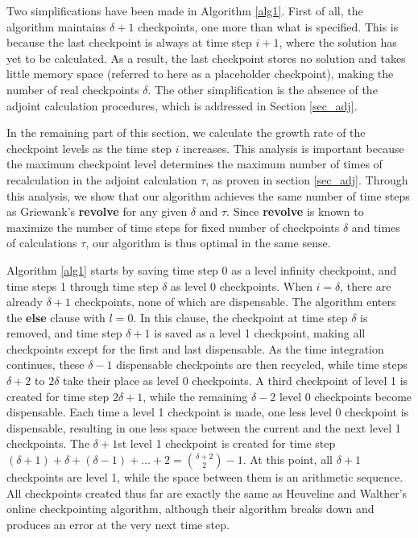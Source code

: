 Two simplifications have been made in Algorithm \ref{alg1}.
First of all, the algorithm maintains $\delta + 1$ checkpoints, one more than
what is specified.  This is because the last checkpoint is always at time step
$i + 1$, where the solution has yet to be calculated.  As a result, the last
checkpoint stores no solution and takes little memory space (referred
to here as a placeholder checkpoint), making the number of real checkpoints
$\delta$.  The other simplification is the absence of the adjoint calculation
procedures, which is addressed in Section \ref{sec_adj}.

In the remaining part of this section, we calculate the growth rate of the
checkpoint levels as the time step $i$ increases.  This analysis is important
because the maximum checkpoint level determines the maximum number of times of
recalculation in the adjoint calculation $\tau$, as proven in section
\ref{sec_adj}.  Through this analysis, we show that our algorithm achieves
the same number of time steps as Griewank's {\bf revolve} for any given $\delta$
and $\tau$.  Since {\bf revolve} is known to maximize the number of time steps
for fixed number of checkpoints $\delta$ and times of calculations $\tau$,
our algorithm is thus optimal in the same sense.

Algorithm \ref{alg1} starts by saving time step 0 as a level infinity
checkpoint, and time steps 1 through time step $\delta$ as
level 0 checkpoints.  When $i = \delta$, there are already $\delta + 1$
checkpoints, none of which are dispensable.  The algorithm enters the
{\bf else} clause with $l = 0$.  In this clause, the checkpoint at time step
$\delta$ is removed, and time step $\delta + 1$ is saved as a level 1
checkpoint, making all checkpoints except for the first and last
dispensable.  As the time integration continues, these $\delta - 1$ dispensable
checkpoints are then recycled, while time steps $\delta + 2$ to $2 \delta$ take
their place as level 0 checkpoints.  A third checkpoint of level 1 is created
for time step $2 \delta + 1$, while the remaining $\delta - 2$ level 0
checkpoints become dispensable.  Each time a level 1 checkpoint is made, one
less level 0 checkpoint is dispensable, resulting in one less space between
the current and the next level 1 checkpoints.  The $\delta + 1$st level 1
checkpoint is created for time step
$(\delta + 1) + \delta + (\delta - 1) + \ldots + 2 = \binom{\delta + 2}{2} - 1$.
At this point, all $\delta + 1$ checkpoints are level 1, while the space
between them is an arithmetic sequence.  All checkpoints created thus far are
exactly the same as Heuveline and Walther's \cite[]{heuveline2006} online
checkpointing algorithm, although their algorithm breaks down and produces an
error at the very next time step.


